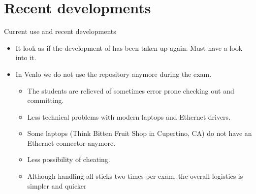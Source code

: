 \section{Recent developments}
\begin{frame}{Current use and recent developments}
  \begin{itemize}
  \item It look as if the development of  has been
    taken up again. Must have a look into it.
  \item In Venlo we do not use the repository anymore during the
    exam.
    \begin{itemize}
    \item The students are relieved of  sometimes error prone checking
      out and committing.
    \item Less technical problems with modern laptops and Ethernet drivers.
    \item Some laptops (Think Bitten Fruit Shop in Cupertino, CA) do not have an
      Ethernet connector anymore.
    \item Less possibility of cheating\InlineCinical.
    \item Although handling all sticks two times per exam, the overall
      logistics is simpler and quicker
    \end{itemize}
  \end{itemize}
\end{frame}